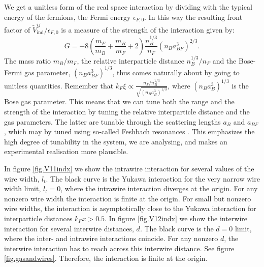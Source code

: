 We get a unitless form of the real space interaction by dividing with the typical energy of the fermions, the Fermi energy $\epsilon_{F,0}$. In this way the resulting front factor of $\tilde{V}^{ij}_{\text{ind}} / \epsilon_{F,0}$ is a measure of the strength of the interaction given by:
\begin{equation}
G = - 8\left( \frac{m_F}{m_B} + \frac{m_B}{m_F} + 2 \right) \frac{n_B^{1/3}}{n_F}(n_Ba_{BF}^3)^{2/3}.
\label{eq.interactionstrength.wires}
\end{equation}
The mass ratio $m_B / m_F$, the relative interparticle distance $n_B^{1/3} / n_F$ and the Bose-Fermi gas parameter, $(n_Ba_{BF}^3)^{1/3}$, thus comes naturally about by going to unitless quantities. Remember that $k_F\xi \propto \frac{n_F /  n_B^{1/3} }{ \sqrt{ (n_Ba_B^3)^{1/3} } }$, where $(n_Ba_B^3)^{1/3}$ is the Bose gas parameter. This means that we can tune both the range and the strength of the interaction by tuning the relative interparticle distance and the gas parameters. The latter are tunable through the scattering lengths $a_B$ and $a_{BF}$, which may by tuned using so-called Feshbach resonances \cite[pp. 143-151]{Pethick}. This emphasizes the high degree of tunability in the system, we are analysing, and makes an experimental realisation more plausible. 

In figure \ref{fig.V11indx} we show the intrawire interaction for several values of the wire width, $l_t$. The black curve is the Yukawa interaction for the very narrow wire width limit, $l_t = 0$, where the intrawire interaction diverges at the origin. For any nonzero wire width the interaction is finite at the origin. For small but nonzero wire widths, the interaction is asymptotically close to the Yukawa interaction for interparticle distances $k_Fx > 0.5$. In figure \ref{fig.V12indx} we show the interwire interaction for several interwire distances, $d$. The black curve is the $d = 0$ limit, where the inter- and intrawire interactions coincide. For any nonzero $d$, the interwire interaction has to reach across this interwire distance. See figure \ref{fig.gasandwires}. Therefore, the interaction is finite at the origin. 

